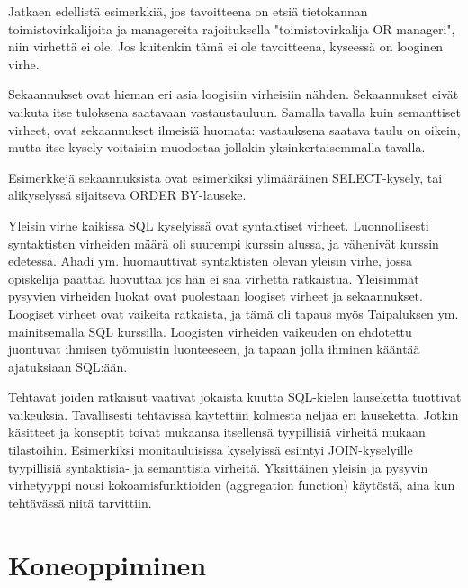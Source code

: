 \documentclass[finnish,twoside,openright]{HYgraduMLDS}
\begin{document}
Jatkaen edellistä esimerkkiä\cite{taipalus2018errors}, jos tavoitteena on etsiä tietokannan toimistovirkalijoita ja managereita rajoituksella "toimistovirkalija OR manageri", niin virhettä ei ole. Jos kuitenkin tämä ei ole tavoitteena, kyseessä on looginen virhe.

Sekaannukset ovat hieman eri asia loogisiin virheisiin nähden. Sekaannukset eivät vaikuta itse tuloksena saatavaan vastaustauluun. Samalla tavalla kuin semanttiset virheet, ovat sekaannukset ilmeisiä huomata: vastauksena saatava taulu on oikein, mutta itse kysely voitaisiin muodostaa jollakin yksinkertaisemmalla tavalla.

Esimerkkejä sekaannuksista ovat esimerkiksi ylimääräinen SELECT-kysely, tai alikyselyssä sijaitseva ORDER BY-lauseke\cite{taipalus2018errors}.

Yleisin virhe kaikissa SQL kyselyissä ovat syntaktiset virheet\cite{Taipalus:2019:EFS:3287324.3287359, Ahadi:2016:SSM:2839509.2844640}. Luonnollisesti syntaktisten virheiden määrä oli suurempi kurssin alussa, ja vähenivät kurssin edetessä. Ahadi ym. \cite{Ahadi:2016:SSM:2839509.2844640} huomauttivat syntaktisten olevan yleisin virhe, jossa opiskelija päättää luovuttaa jos hän ei saa virhettä ratkaistua. Yleisimmät pysyvien virheiden luokat ovat puolestaan loogiset virheet ja sekaannukset\cite{Taipalus:2019:EFS:3287324.3287359}. Loogiset virheet ovat vaikeita ratkaista, ja tämä oli tapaus myös Taipaluksen ym. \cite{Taipalus:2019:EFS:3287324.3287359} mainitsemalla SQL kurssilla. Loogisten virheiden vaikeuden on ehdotettu juontuvat ihmisen työmuistin luonteeseen, ja tapaan jolla ihminen kääntää ajatuksiaan SQL:ään\cite{SMELCER1995353}. 

Tehtävät joiden ratkaisut vaativat jokaista kuutta SQL-kielen lauseketta tuottivat vaikeuksia\cite{Taipalus:2019:EFS:3287324.3287359}. Tavallisesti tehtävissä käytettiin kolmesta neljää eri lauseketta. Jotkin käsitteet ja konseptit toivat mukaansa itsellensä tyypillisiä virheitä mukaan tilastoihin. Esimerkiksi monitauluisissa kyselyissä esiintyi JOIN-kyselyille tyypillisiä syntaktisia- ja semanttisia virheitä. Yksittäinen yleisin ja pysyvin virhetyyppi nousi kokoamisfunktioiden (aggregation function) käytöstä, aina kun tehtävässä niitä tarvittiin. 


\section{Koneoppiminen}
\end{document}
